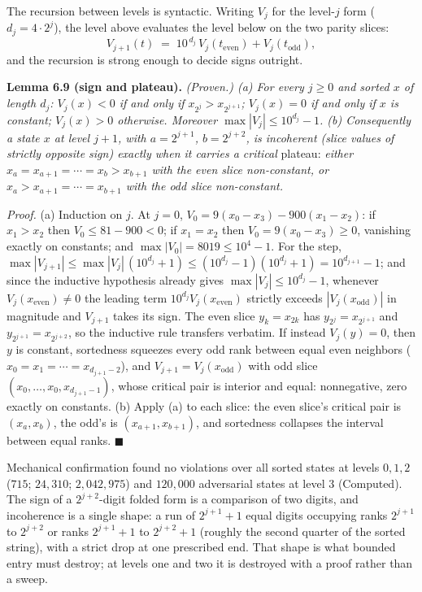 \documentclass[11pt,letterpaper]{article}
\theoremstyle{paperstyle}
\theoremstyle{paperstyledef}
\theoremstyle{paperstylerem}
\begin{document}
The recursion between levels is syntactic. Writing \(V_{j}\) for the level-\(j\) form (\(d_j = 4 \cdot 2^j\)), the level above evaluates the level below on the two parity slices: \[V_{j+1}(t) \;=\; 10^{\,d_j}\, V_j(t_{\mathrm{even}}) + V_j(t_{\mathrm{odd}}),\] and the recursion is strong enough to decide signs outright.

\textbf{Lemma 6.9 (sign and plateau).} \emph{(Proven.) (a) For every \(j \geq 0\) and sorted \(x\) of length \(d_j\): \(V_j(x) < 0\) if and only if \(x_{2^j} > x_{2^{j+1}}\); \(V_j(x) = 0\) if and only if \(x\) is constant; \(V_j(x) > 0\) otherwise. Moreover \(\max |V_j| \leq 10^{d_j} - 1\). (b) Consequently a state \(x\) at level \(j+1\), with \(a = 2^{j+1}\), \(b = 2^{j+2}\), is incoherent (slice values of strictly opposite sign) exactly when it carries a critical} plateau: \emph{either \(x_a = x_{a+1} = \cdots = x_b > x_{b+1}\) with the even slice non-constant, or \(x_a > x_{a+1} = \cdots = x_{b+1}\) with the odd slice non-constant.}

\emph{Proof.} (a) Induction on \(j\). At \(j = 0\), \(V_0 = 9(x_0 - x_3) - 900(x_1 - x_2)\): if \(x_1 > x_2\) then \(V_0 \leq 81 - 900 < 0\); if \(x_1 = x_2\) then \(V_0 = 9(x_0 - x_3) \geq 0\), vanishing exactly on constants; and \(\max|V_0| = 8019 \leq 10^4 - 1\). For the step, \(\max|V_{j+1}| \leq \max|V_j|\,(10^{d_j} + 1) \leq (10^{d_j} - 1)(10^{d_j} + 1) = 10^{d_{j+1}} - 1\); and since the inductive hypothesis already gives \(\max|V_j| \leq 10^{d_j} - 1\), whenever \(V_j(x_{\mathrm{even}}) \neq 0\) the leading term \(10^{d_j} V_j(x_{\mathrm{even}})\) strictly exceeds \(|V_j(x_{\mathrm{odd}})|\) in magnitude and \(V_{j+1}\) takes its sign. The even slice \(y_k = x_{2k}\) has \(y_{2^j} = x_{2^{j+1}}\) and \(y_{2^{j+1}} = x_{2^{j+2}}\), so the inductive rule transfers verbatim. If instead \(V_j(y) = 0\), then \(y\) is constant, sortedness squeezes every odd rank between equal even neighbors (\(x_0 = x_1 = \cdots = x_{d_{j+1}-2}\)), and \(V_{j+1} = V_j(x_{\mathrm{odd}})\) with odd slice \((x_0, \dots, x_0, x_{d_{j+1}-1})\), whose critical pair is interior and equal: nonnegative, zero exactly on constants. (b) Apply (a) to each slice: the even slice's critical pair is \((x_a, x_b)\), the odd's is \((x_{a+1}, x_{b+1})\), and sortedness collapses the interval between equal ranks. \(\blacksquare\)

Mechanical confirmation found no violations over all sorted states at levels \(0, 1, 2\) (\(715\); \(24{,}310\); \(2{,}042{,}975\)) and \(120{,}000\) adversarial states at level \(3\) (Computed). The sign of a \(2^{j+2}\)-digit folded form is a comparison of two digits, and incoherence is a single shape: a run of \(2^{j+1} + 1\) equal digits occupying ranks \(2^{j+1}\) to \(2^{j+2}\) or ranks \(2^{j+1} + 1\) to \(2^{j+2} + 1\) (roughly the second quarter of the sorted string), with a strict drop at one prescribed end. That shape is what bounded entry must destroy; at levels one and two it is destroyed with a proof rather than a sweep.
\end{document}
